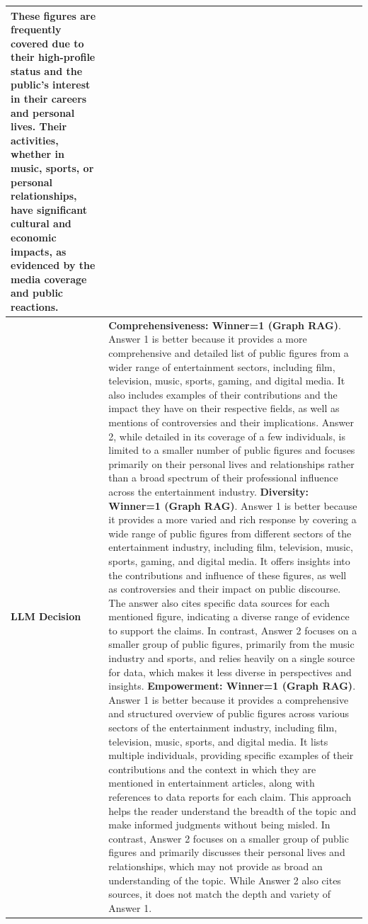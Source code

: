 \begin{table}[h]
\begin{tabular}{>{\raggedright\arraybackslash}p{}>{\raggedright\arraybackslash}p{}}
These figures are frequently covered due to their high-profile status and the public's interest in their careers and personal lives. Their activities, whether in music, sports, or personal relationships, have significant cultural and economic impacts, as evidenced by the media coverage and public reactions.
\vspace*{2mm}\\ \hline 
\textbf{LLM \break Decision} & \textbf{Comprehensiveness: Winner=1 (Graph RAG)}. Answer 1 is better because it provides a more comprehensive and detailed list of public figures from a wider range of entertainment sectors, including film, television, music, sports, gaming, and digital media. It also includes examples of their contributions and the impact they have on their respective fields, as well as mentions of controversies and their implications. Answer 2, while detailed in its coverage of a few individuals, is limited to a smaller number of public figures and focuses primarily on their personal lives and relationships rather than a broad spectrum of their professional influence across the entertainment industry.
\vspace*{2mm}
\newline
\textbf{Diversity: Winner=1 (Graph RAG)}. Answer 1 is better because it provides a more varied and rich response by covering a wide range of public figures from different sectors of the entertainment industry, including film, television, music, sports, gaming, and digital media. It offers insights into the contributions and influence of these figures, as well as controversies and their impact on public discourse. The answer also cites specific data sources for each mentioned figure, indicating a diverse range of evidence to support the claims. In contrast, Answer 2 focuses on a smaller group of public figures, primarily from the music industry and sports, and relies heavily on a single source for data, which makes it less diverse in perspectives and insights.
\vspace*{2mm}
\newline
\textbf{Empowerment: Winner=1 (Graph RAG)}. Answer 1 is better because it provides a comprehensive and structured overview of public figures across various sectors of the entertainment industry, including film, television, music, sports, and digital media. It lists multiple individuals, providing specific examples of their contributions and the context in which they are mentioned in entertainment articles, along with references to data reports for each claim. This approach helps the reader understand the breadth of the topic and make informed judgments without being misled. In contrast, Answer 2 focuses on a smaller group of public figures and primarily discusses their personal lives and relationships, which may not provide as broad an understanding of the topic. While Answer 2 also cites sources, it does not match the depth and variety of Answer 1.

\end{tabular}
\end{table}
